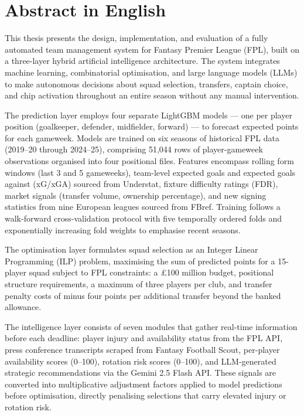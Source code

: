 
\section*{Abstract in English}

This thesis presents the design, implementation, and evaluation of a fully automated team management system for Fantasy Premier League (FPL), built on a three-layer hybrid artificial intelligence architecture. The system integrates machine learning, combinatorial optimisation, and large language models (LLMs) to make autonomous decisions about squad selection, transfers, captain choice, and chip activation throughout an entire season without any manual intervention.

The prediction layer employs four separate LightGBM models — one per player position (goalkeeper, defender, midfielder, forward) — to forecast expected points for each gameweek. Models are trained on six seasons of historical FPL data (2019--20 through 2024--25), comprising 51,044 rows of player-gameweek observations organised into four positional files. Features encompass rolling form windows (last 3 and 5 gameweeks), team-level expected goals and expected goals against (xG/xGA) sourced from Understat, fixture difficulty ratings (FDR), market signals (transfer volume, ownership percentage), and new signing statistics from nine European leagues sourced from FBref. Training follows a walk-forward cross-validation protocol with five temporally ordered folds and exponentially increasing fold weights to emphasise recent seasons.

The optimisation layer formulates squad selection as an Integer Linear Programming (ILP) problem, maximising the sum of predicted points for a 15-player squad subject to FPL constraints: a \pounds 100 million budget, positional structure requirements, a maximum of three players per club, and transfer penalty costs of minus four points per additional transfer beyond the banked allowance.

The intelligence layer consists of seven modules that gather real-time information before each deadline: player injury and availability status from the FPL API, press conference transcripts scraped from Fantasy Football Scout, per-player availability scores (0--100), rotation risk scores (0--100), and LLM-generated strategic recommendations via the Gemini 2.5 Flash API. These signals are converted into multiplicative adjustment factors applied to model predictions before optimisation, directly penalising selections that carry elevated injury or rotation risk.

